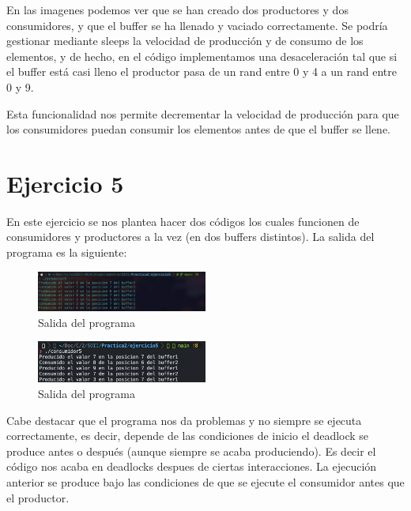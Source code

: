 \documentclass[twocolumn]{article}
\begin{document}
En las imagenes podemos ver que se han creado dos productores y dos consumidores, y que el buffer se ha llenado y vaciado correctamente. Se podría gestionar mediante sleeps la velocidad de producción y de consumo de los elementos, y de hecho, en el código implementamos una desaceleración tal que si el buffer está casi lleno el productor pasa de un rand entre 0 y 4 a un rand entre 0 y 9. 

Esta funcionalidad nos permite decrementar la velocidad de producción para que los consumidores puedan consumir los elementos antes de que el buffer se llene.

\section{Ejercicio 5}

En este ejercicio se nos plantea hacer dos códigos los cuales funcionen de consumidores y productores a la vez (en dos buffers distintos). La salida del programa es la siguiente:

\begin{figure}[H]
    \centering
    \includegraphics[width=0.5\textwidth]{ejercicio5/productor5.jpg}
    \caption{Salida del programa} 
    \label{fig:my_label}
\end{figure}

\begin{figure}[H]
    \centering
    \includegraphics[width=0.5\textwidth]{ejercicio5/consumidor5.jpg}
    \caption{Salida del programa} 
    \label{fig:my_label}
\end{figure}

Cabe destacar que el programa nos da problemas y no siempre se ejecuta correctamente, es decir, depende de las condiciones de inicio el deadlock se produce antes o después (aunque siempre se acaba produciendo). Es decir el código nos acaba en deadlocks despues de ciertas interacciones. La ejecución anterior se produce bajo las condiciones de que se ejecute el consumidor antes que el productor.
\end{document}
